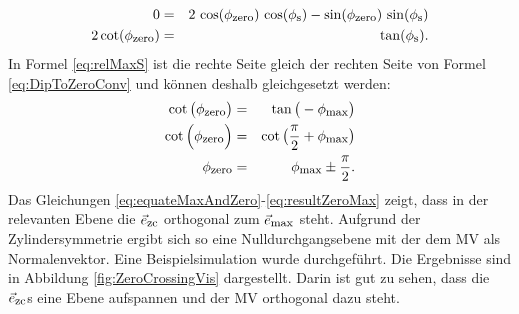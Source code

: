         \begin{eqnarray}
            0 &=& 2 \, \cos(\phi_{\textrm{\footnotesize{zero}}})\,\cos(\phi_{\textrm{\footnotesize{s}}}) - \sin(\phi_{\textrm{\footnotesize{zero}}}) \, \sin(\phi_{\textrm{\footnotesize{s}}})
            \label{eq:DipoletoZero}\\
            2 \cot(\phi_{\textrm{\footnotesize{zero}}})&=&\tan(\phi_{\textrm{\footnotesize{s}}}).
        \label{eq:DipToZeroConv}
        \end{eqnarray}
        In Formel \ref{eq:relMaxS} ist die rechte Seite gleich der rechten Seite von Formel \ref{eq:DipToZeroConv} und können deshalb gleichgesetzt werden: 
        \begin{eqnarray}
            \cot\big(\phi_{\textrm{\footnotesize{zero}}}\big) &=& \tan\big(-\phi_{\textrm{\footnotesize{max}}}\big)
            \label{eq:equateMaxAndZero}\\
            \cot\Big(\phi_{\textrm{\footnotesize{zero}}}\Big) &=& \cot\big(\frac{\pi}{2}+\phi_{\textrm{\footnotesize{max}}}\big)
            \label{eq:showAngel}\\
            \phi_{\textrm{\footnotesize{zero}}} &=& \phi_{\textrm{\footnotesize{max}}} \pm \frac{\pi}{2}.
            \label{eq:resultZeroMax}
        \end{eqnarray}
        Das Gleichungen \ref{eq:equateMaxAndZero}-\ref{eq:resultZeroMax} zeigt, dass in der relevanten Ebene die $\vec{e}_{\textrm{\footnotesize{zc}}}$ orthogonal zum $\vec{e}_{\textrm{\footnotesize{max}}}$ steht. Aufgrund der Zylindersymmetrie ergibt sich so eine  Nulldurchgangsebene mit der dem MV als Normalenvektor. Eine Beispielsimulation wurde durchgeführt. Die Ergebnisse sind in Abbildung \ref{fig:ZeroCrossingVis} dargestellt. Darin ist gut zu sehen, dass die $\vec{e}_{\textrm{\footnotesize{zc}}}$s eine Ebene aufspannen und der MV orthogonal dazu steht. 



